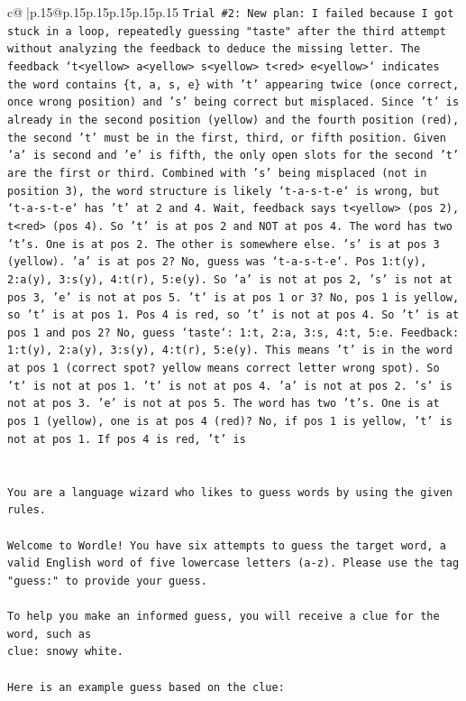 \documentclass{article}
\begin{document}
{\begin{supertabular}{c@{$\;$}|p{.15\linewidth}@{}p{.15\linewidth}p{.15\linewidth}p{.15\linewidth}p{.15\linewidth}p{.15\linewidth}}
{{{\texttt{Trial \#2: New plan: I failed because I got stuck in a loop, repeatedly guessing "taste" after the third attempt without analyzing the feedback to deduce the missing letter. The feedback `t<yellow> a<yellow> s<yellow> t<red> e<yellow>` indicates the word contains \{t, a, s, e\} with 't' appearing twice (once correct, once wrong position) and 's' being correct but misplaced. Since 't' is already in the second position (yellow) and the fourth position (red), the second 't' must be in the first, third, or fifth position. Given 'a' is second and 'e' is fifth, the only open slots for the second 't' are the first or third. Combined with 's' being misplaced (not in position 3), the word structure is likely `t{-}a{-}s{-}t{-}e` is wrong, but `t{-}a{-}s{-}t{-}e` has 't' at 2 and 4. Wait, feedback says t<yellow> (pos 2), t<red> (pos 4). So 't' is at pos 2 and NOT at pos 4. The word has two 't's. One is at pos 2. The other is somewhere else. 's' is at pos 3 (yellow). 'a' is at pos 2? No, guess was `t{-}a{-}s{-}t{-}e`. Pos 1:t(y), 2:a(y), 3:s(y), 4:t(r), 5:e(y). So 'a' is not at pos 2, 's' is not at pos 3, 'e' is not at pos 5. 't' is at pos 1 or 3? No, pos 1 is yellow, so 't' is at pos 1. Pos 4 is red, so 't' is not at pos 4. So 't' is at pos 1 and pos 2? No, guess `taste`: 1:t, 2:a, 3:s, 4:t, 5:e. Feedback: 1:t(y), 2:a(y), 3:s(y), 4:t(r), 5:e(y). This means 't' is in the word at pos 1 (correct spot? yellow means correct letter wrong spot). So 't' is not at pos 1. 't' is not at pos 4. 'a' is not at pos 2. 's' is not at pos 3. 'e' is not at pos 5. The word has two 't's. One is at pos 1 (yellow), one is at pos 4 (red)? No, if pos 1 is yellow, 't' is not at pos 1. If pos 4 is red, 't' is} \\
\\ 
\\ 
\texttt{You are a language wizard who likes to guess words by using the given rules.} \\
\\ 
\texttt{Welcome to Wordle! You have six attempts to guess the target word, a valid English word of five lowercase letters (a{-}z). Please use the tag "guess:" to provide your guess.} \\
\\ 
\texttt{To help you make an informed guess, you will receive a clue for the word, such as} \\
\texttt{clue: snowy white.} \\
\\ 
\texttt{Here is an example guess based on the clue: } \\
}}}
\end{supertabular}}
\end{document}
